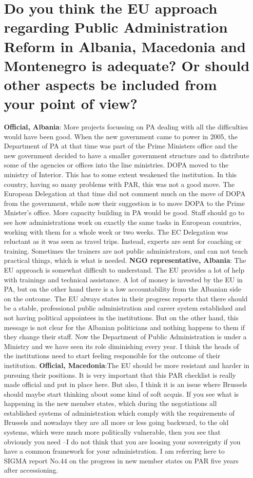 \section{Do you think the EU approach regarding Public Administration Reform in Albania, Macedonia and Montenegro is adequate? Or should other aspects be included from your point of view?}
\textbf{Official, Albania}: More projects focussing on PA dealing with all the difficulties would have been good. When the new government came to power in 2005, the Department of PA at that time was part of the Prime Ministers office and the new government decided to have a smaller government structure and to distribute some of the agencies or offices into the line ministries. DOPA moved to the ministry of Interior. This has to some extent weakened the institution. In this country, having so many problems with PAR, this was not a good move. The European Delegation at that time did not comment much on the move of DOPA from the government, while now their suggestion is to move DOPA to the Prime Mnister’s office. More capacity building in PA would be good. Staff should go to see how administrations work on exactly the same tasks in European countries, working with them for a whole week or two weeks. The EC Delegation was reluctant as it was seen as travel trips. Instead, experts are sent for coaching or training. Sometimes the trainers are not public administrators, and can not teach practical things, which is what is needed.
\textbf{NGO representative, Albania}: The EU approach is somewhat difficult to understand. The EU provides a lot of help with trainings and technical assistance. A lot of money is invested by the EU in PA, but on the other hand there is a low accountability from the Albanian side on the outcome. The EU always states in their progress reports that there should be a stable, professional public administration and career system established and not having political appointees in the institutions. But on the other hand, this message is not clear for the Albanian politicians and nothing happens to them if they change their staff. Now the Department of Public Administration is under a Ministry and we have seen its role diminishing every year.  I think the heads of the institutions need to start feeling responsible for the outcome of their institution. 
\textbf{Official, Macedonia}:The EU should be more resistant and harder in pursuing their positions. It is very important that this PAR checklist is really made official and put in place here. But also, I think it is an issue where Brussels should maybe start thinking about some kind of soft acquis. If you see what is happening in the new member states, which during the negotiations all established systems of administration which comply with the requirements of Brussels and nowadays they are all more or less going backward, to the old systems, which were much more politically vulnerable, then you see that obviously you need –I do not think that you are loosing your sovereignty if you have a common framework for your administration. I am referring here to SIGMA report No.44 on the progress in new member states on PAR five years after accessioning.
